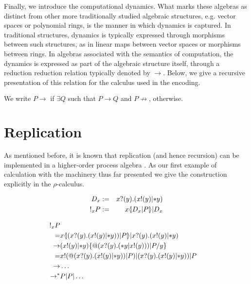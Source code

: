 \documentclass{llncs}
\makeatletter
\newcommand{\lliftb}{\langle\!|}
\newcommand{\rliftb}{|\!\rangle}
\newcommand{\scong}{\mathbin{\equiv}}
\newcommand{\nameeq}{\mathbin{\equiv_N}}
\newcommand{\binpar}[2]{#1 | #2}
\newcommand{\outputp}[2]{#1!(#2)}
\newcommand{\prefix}[3]{#1?(#2) . #3}
\newcommand{\lift}[2]{#1 \lliftb #2 \rliftb}
\newcommand{\clift}[1]{\lliftb #1 \rliftb}
\newcommand{\quotep}[1]{\mathsf{@}#1}
\newcommand{\dropn}[1]{\mathsf{*}#1}
\newcommand{\bangp}[1]{! #1}
\newcommand{\substn}[2]{\{ #1 / #2 \}}
\newcommand{\red}{\rightarrow}
\newcommand{\wred}{\Rightarrow}
\newcommand{\vect}[1]{\stackrel{\rightharpoonup}{#1}}
\newcommand{\rhoc}{$\rho$-calculus}
\makeatother
\begin{document}
Finally, we introduce the computational dynamics. What marks these
algebras as distinct from other more traditionally studied algebraic
structures, e.g. vector spaces or polynomial rings, is the manner in
which dynamics is captured. In traditional structures, dynamics is typically
expressed through morphisms between such structures, as in linear maps
between vector spaces or morphisms between rings. In algebras
associated with the semantics of computation, the dynamics is
expressed as part of the algebraic structure itself, through a
reduction reduction relation typically denoted by $\red$. Below, we
give a recursive presentation of this relation for the calculus used
in the encoding.


We write $P\red$ if $\exists Q $ such that $ P \red Q$ and $P\not\red$, otherwise.

\section{Replication}

As mentioned before, it is known that replication (and hence
recursion) can be implemented in a higher-order process algebra
\cite{SangiorgiWalker}. As our first example of calculation with the
machinery thus far presented we give the construction explicitly in
the {\rhoc}.

\begin{eqnarray}
	D_{x} & := & \prefix{x}{y}{(\binpar{\outputp{x}{y}}{\dropn{y}})} \nonumber\\
	\bangp_{x}{P} & := & \binpar{\lift{x}{\binpar{D_{x}}{P}}}{D_{x}} \nonumber
\end{eqnarray}

\begin{eqnarray}
	\bangp_{x}{P} & & \nonumber\\
	=
	& \lift{x}{(\prefix{x}{y}{(\outputp{x}{y} | \dropn{y})) | P}} 
	      | \prefix{x}{y}{(\outputp{x}{y} | \dropn{y})} & \nonumber\\
	\red
	& (\outputp{x}{y} | \dropn{y})\substn{\quotep{(\prefix{x}{y}{(\dropn{y} | \outputp{x}{y})) | P}}}{y} & \nonumber\\
	=
	& \outputp{x}{\quotep{(\prefix{x}{y}{(\outputp{x}{y} | \dropn{y})) | P}}}
	  | {(\prefix{x}{y}{(\outputp{x}{y} | \dropn{y})) | P}} & \nonumber\\
	\red
	& \ldots & \nonumber\\
	\red^*
	& P | P | \ldots & \nonumber
\end{eqnarray}
\end{document}
